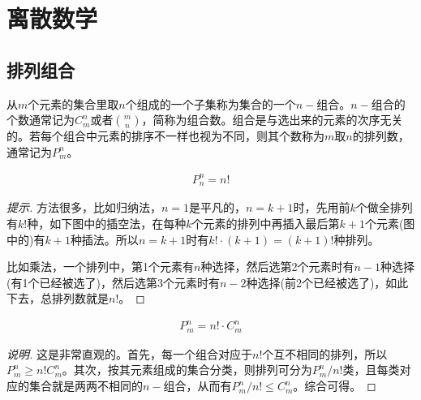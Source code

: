 
\chapter{离散数学}
\label{chap:discrete-mathematics}

\section{排列组合}
\label{sec:permutation-and-combination}

从$m$个元素的集合里取$n$个组成的一个子集称为集合的一个$n-\text{组合}$。$n-\text{组合}$的个数通常记为$C_m^n$或者$\binom mn$，简称为组合数。组合是与选出来的元素的次序无关的。若每个组合中元素的排序不一样也视为不同，则其个数称为$m$取$n$的排列数，通常记为$P_m^n$。
\begin{theorem}[全排列]
  \begin{align*}
    P_n^n = n!
  \end{align*}
\end{theorem}
\begin{proof}[提示]
  方法很多，比如归纳法，$n=1$是平凡的，$n=k+1$时，先用前$k$个做全排列有$k!$种，如下图中的插空法，在每种$k$个元素的排列中再插入最后第$k+1$个元素(图中的)有$k+1$种插法。所以$n=k+1$时有$k! \cdot (k+1) = (k+1)!$种排列。

  \begin{center}
  \end{center}

  比如乘法，一个排列中，第1个元素有$n$种选择，然后选第2个元素时有$n-1$种选择(有1个已经被选了)，然后选第3个元素时有$n-2$种选择(前2个已经被选了)，如此下去，总排列数就是$n!$。
\end{proof}

\begin{theorem}
  \begin{align*}
    P_m^n = n! \cdot C_m^n
  \end{align*}
\end{theorem}
\begin{proof}[说明]
  这是非常直观的。首先，每一个组合对应于$n!$个互不相同的排列，所以$P_m^n\ge n! C_m^n$。其次，按其元素组成的集合分类，则排列可分为$P_m^n/n!$类，且每类对应的集合就是两两不相同的$n-\text{组合}$，从而有$P_m^n/n!\le C_m^n$。综合可得。
\end{proof}

